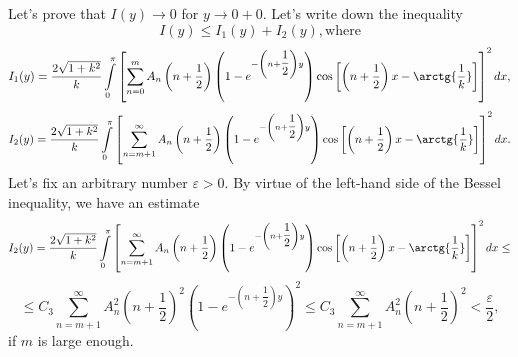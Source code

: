 \documentclass[11pt,twoside]{article}
\begin{document}
	Let's prove that $I(y)\to 0$ for $y\to 0+0$. Let's write down the inequality
	\begin{equation*}
		I(y) \leq I_1(y) + I_2(y), \text{where}
	\end{equation*}
	\begin{equation*}
		I_1(y) = \dfrac{2\sqrt{1 + k^2}}{k}\int\limits_0^\pi \left[	\sum\limits_{n=0}^{m} A_n\left(n+\dfrac12\right) \left( 1- e^{-\left(n+\dfrac12\right)y}\right)\cos{\left[\left(n + \dfrac12 \right)x  - \arctg{\dfrac{1}{k}}\right]} \right]^2 dx, 
	\end{equation*}
	\begin{equation*}
		I_2(y) = \dfrac{2\sqrt{1 + k^2}}{k}\int\limits_0^\pi \left[	\sum\limits_{n=m+1}^{\infty} A_n\left(n+\dfrac12\right) \left(1 -  e^{-\left(n+\dfrac12\right)y}\right)\cos{\left[\left(n + \dfrac12 \right)x  - \arctg{\dfrac{1}{k}}\right]} \right]^2 dx.
	\end{equation*}
	Let's fix an arbitrary number $\varepsilon > 0$. By virtue of the left-hand side of the Bessel inequality, we have an estimate
	\begin{equation*}
		I_2(y) =  \dfrac{2\sqrt{1 + k^2}}{k}\int\limits_0^\pi \left[	\sum\limits_{n=m+1}^{\infty} A_n\left(n+\dfrac12\right) \left( 1 -  e^{-\left(n+\dfrac12\right)y} \right) \cos{\left[\left(n + \dfrac12 \right)x  - \arctg{\dfrac{1}{k}}\right]} \right]^2 dx \leq 
	\end{equation*}
	\begin{equation*}
		\leq  C_3 \sum\limits_{n=m+1}^{\infty} A_n^2 \left(n+\dfrac12\right)^2 \left(1 - e^{-\left(n+\dfrac12\right)y} \right)^2 \leq C_3 \sum\limits_{n=m+1}^{\infty} A_n^2 \left(n+\dfrac12\right)^2 < \dfrac{\varepsilon}{2},
	\end{equation*}
	if $m$ is large enough.\newline
	
\end{document}
